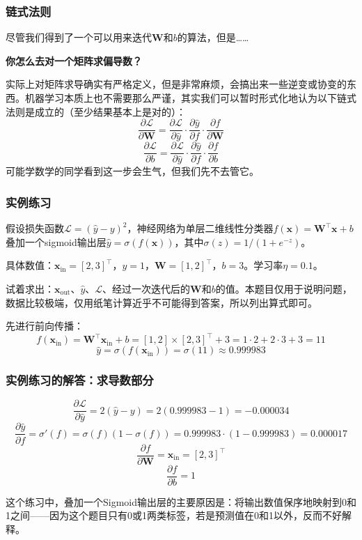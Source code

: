\documentclass{ctexbeamer}
\begin{document}
\begin{frame}
    \frametitle{链式法则}

    尽管我们得到了一个可以用来迭代$\mathbf{W}$和$b$的算法，但是……

    \textbf{你怎么去对一个矩阵求偏导数？}

    实际上对矩阵求导确实有严格定义，但是非常麻烦，会搞出来一些逆变或协变的东西。机器学习本质上也不需要那么严谨，其实我们可以暂时形式化地认为以下链式法则是成立的（至少结果基本上是对的）：
    \[\frac{\partial \mathcal{L}}{\partial \mathbf{W}} = \frac{\partial \mathcal{L}}{\partial \hat{y}} \cdot \frac{\partial \hat{y}}{\partial f} \cdot \frac{\partial f}{\partial \mathbf{W}}\]
    \[\frac{\partial \mathcal{L}}{\partial b} = \frac{\partial \mathcal{L}}{\partial \hat{y}} \cdot \frac{\partial \hat{y}}{\partial f} \cdot \frac{\partial f}{\partial b}\]
    可能学数学的同学看到这一步会生气，但我们先不去管它。
\end{frame}

\begin{frame}
    \frametitle{实例练习}

    假设损失函数$\mathcal{L} = (\hat{y} - y)^2$，神经网络为单层二维线性分类器$f(\mathbf{x}) = \mathbf{W}^\top \mathbf{x} + b$叠加一个sigmoid输出层$\hat{y} = \sigma(f(\mathbf{x}))$，其中$\sigma(z) = 1/(1 + e^{-z})$。

    具体数值：$\mathbf{x}_\text{in} = [2, 3]^\top$，$y = 1$，$\mathbf{W} = [1, 2]^\top$，$b = 3$。学习率$\eta = 0.1$。

    试着求出：$\mathbf{x}_\text{out}$、$\hat{y}$、$\mathcal{L}$、经过一次迭代后的$\mathbf{W}$和$b$的值。本题目仅用于说明问题，数据比较极端，仅用纸笔计算近乎不可能得到答案，所以列出算式即可。

    \hspace{2em}

    \pause

    先进行前向传播：
    \[f(\mathbf{x}_\text{in}) = \mathbf{W}^\top \mathbf{x}_\text{in} + b = [1, 2] \times [2, 3]^\top + 3 = 1 \cdot 2 + 2 \cdot 3 + 3 = 11\]
    \[\hat{y} = \sigma(f(\mathbf{x}_\text{in})) = \sigma(11) \approx 0.999983\]
\end{frame}

\begin{frame}
    \frametitle{实例练习的解答：求导数部分}

    \[\frac{\partial \mathcal{L}}{\partial \hat{y}} = 2(\hat{y} - y) = 2(0.999983 - 1) = -0.000034\]
    \[\frac{\partial \hat{y}}{\partial f} = \sigma'(f) = \sigma(f)(1 - \sigma(f)) = 0.999983 \cdot (1 - 0.999983) = 0.000017\]
    \[\frac{\partial f}{\partial \mathbf{W}} = \mathbf{x}_\text{in} = [2, 3]^\top\]
    \[\frac{\partial f}{\partial b} = 1\]

    这个练习中，叠加一个Sigmoid输出层的主要原因是：将输出数值保序地映射到0和1之间——因为这个题目只有0或1两类标签，若是预测值在0和1以外，反而不好解释。

\end{frame}
\end{document}
